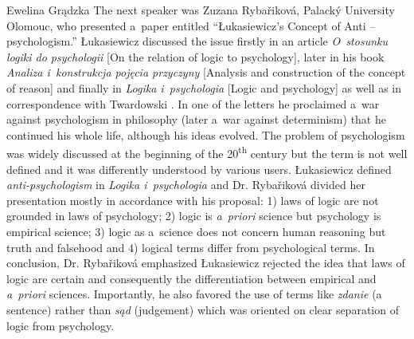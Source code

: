 \begin{editorialeng}{Ewelina Grądzka}
The next speaker was Zuzana Rybařiková, Palacký University Olomouc, who presented a~paper entitled ``Łukasiewicz’s Concept of Anti – psychologism.'' Łukasiewicz discussed the issue firstly in an article \textit{O~stosunku logiki do psychologii} [On the relation of logic to psychology], later in his book \textit{Analiza i~konstrukcja pojęcia przyczyny} [Analysis and construction of the concept of reason]
\parencite[][]{lukasiewicz_analiza_1906} %
 and finally in \textit{Logika i~psychologia} [Logic and psychology] as well as in correspondence with Twardowski 
\parencite[][]{lukasiewicz_logika_1998}. %
 In one of the letters he proclaimed a~war against psychologism in philosophy (later a~war against determinism) that he continued his whole life, although his ideas evolved. The problem of psychologism was widely discussed at the beginning of the 20\textsuperscript{th} century but the term is not well defined and it was differently understood by various users. Łukasiewicz defined \textit{anti-psychologism} in \textit{Logika i~psychologia} and Dr. Rybařiková divided her presentation mostly in accordance with his proposal: 1) laws of logic are not grounded in laws of psychology; 2) logic is \textit{a~priori} science but psychology is empirical science; 3) logic as a~science does not concern human reasoning but truth and falsehood and 4) logical terms differ from psychological terms. In conclusion, Dr. Rybařiková emphasized Łukasiewicz rejected the idea that laws of logic are certain and consequently the differentiation between empirical and \textit{a~priori} sciences. Importantly, he also favored the use of terms like \textit{zdanie} (a sentence) rather than \textit{sąd} (judgement) which was oriented on clear separation of logic from psychology.


\end{editorialeng}
